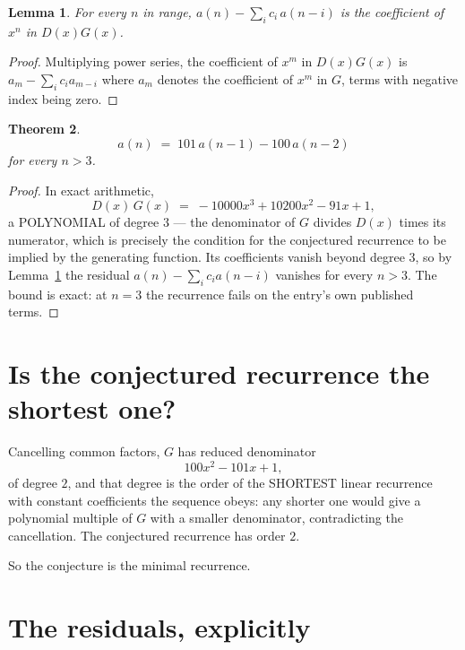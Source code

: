 \documentclass[11pt,a4paper]{article}
\theoremstyle{plain}
\newtheorem{theorem}{Theorem}
\newtheorem{lemma}[theorem]{Lemma}
\theoremstyle{definition}
\begin{document}
\begin{lemma}\label{lem:key}
For every $n$ in range, $a(n)-\sum_i c_i\,a(n-i)$ is the coefficient of $x^{n}$ in
$D(x)G(x)$.
\end{lemma}

\begin{proof}
Multiplying power series, the coefficient of $x^{m}$ in $D(x)G(x)$ is
$a_m-\sum_i c_i a_{m-i}$ where $a_m$ denotes the coefficient of $x^{m}$ in $G$, terms with
negative index being zero.
\end{proof}

\begin{theorem}
\[
a(n)\;=\;101\,a(n-1) - 100\,a(n-2)
\]
for every $n>3$.
\end{theorem}

\begin{proof}
In exact arithmetic,
\[
D(x)\,G(x)\;=\;- 10000 x^{3} + 10200 x^{2} - 91 x + 1,
\]
a POLYNOMIAL of degree $3$ --- the denominator of $G$ divides $D(x)$ times its numerator,
which is precisely the condition for the conjectured recurrence to be implied by the
generating function. Its coefficients vanish beyond degree $3$, so by
Lemma~\ref{lem:key} the residual $a(n)-\sum_ic_ia(n-i)$ vanishes for every
$n>3$. The bound is exact: at $n=3$ the recurrence fails on the entry's own published terms.
\end{proof}

\section{Is the conjectured recurrence the shortest one?}

Cancelling common factors, $G$ has reduced denominator
\[
100 x^{2} - 101 x + 1,
\]
of degree $2$, and that degree is the order of the SHORTEST linear recurrence with
constant coefficients the sequence obeys: any shorter one would give a polynomial multiple of
$G$ with a smaller denominator, contradicting the cancellation. The conjectured recurrence has
order $2$.

So the conjecture is the minimal recurrence.

\section{The residuals, explicitly}
\end{document}
